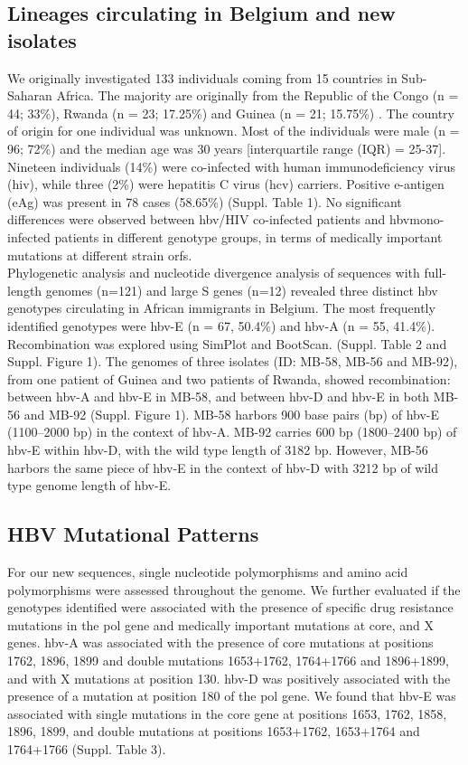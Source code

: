 \subsection{Lineages circulating in Belgium and new isolates}
We originally investigated 133 individuals coming from 15 countries in Sub-Saharan Africa. The majority are originally from the Republic of the Congo (n = 44; 33\%), Rwanda (n = 23; 17.25\%) and Guinea (n = 21; 15.75\%) . The country of origin for one individual was unknown. Most of the individuals were male (n = 96; 72\%) and the median age was 30 years [interquartile range (IQR) = 25-37]. Nineteen individuals (14\%) were co-infected with human immunodeficiency virus (\gls{hiv}), while three (2\%) were hepatitis C virus (\gls{hcv}) carriers. Positive e-antigen (eAg) was present in 78 cases (58.65\%) (Suppl. Table 1). No significant differences were observed between \gls{hbv}/HIV co-infected patients and \gls{hbv}mono-infected patients in different genotype groups, in terms of medically important mutations at different strain \gls{orf}s.\\

Phylogenetic analysis and nucleotide divergence analysis of sequences with full-length genomes (n=121) and large S genes (n=12) revealed three distinct \gls{hbv} genotypes circulating in African immigrants in Belgium. The most frequently identified genotypes were \gls{hbv}-E (n = 67, 50.4\%) and \gls{hbv}-A (n = 55, 41.4\%).  Recombination was explored using SimPlot and BootScan. (Suppl. Table 2 and  Suppl. Figure 1). The genomes of three isolates (ID: MB-58, MB-56 and MB-92), from one patient of Guinea and two patients of Rwanda, showed recombination: between \gls{hbv}-A and \gls{hbv}-E in MB-58, and between \gls{hbv}-D and \gls{hbv}-E in both MB-56 and MB-92 (Suppl. Figure 1). MB-58 harbors 900 base pairs (bp) of \gls{hbv}-E (1100--2000 bp) in the context of \gls{hbv}-A. MB-92 carries 600 bp (1800--2400 bp) of \gls{hbv}-E within \gls{hbv}-D, with the wild type length of 3182 bp. However, MB-56 harbors the same piece of \gls{hbv}-E in the context of \gls{hbv}-D with 3212 bp of wild type genome length of \gls{hbv}-E. 

\subsection{HBV Mutational Patterns}
For our new sequences, single nucleotide polymorphisms and amino acid polymorphisms were assessed throughout the genome. We further evaluated if the genotypes identified were associated with the presence of specific drug resistance mutations in the pol gene and medically important mutations at core, and X genes. \gls{hbv}-A was associated with the presence of core mutations at positions 1762, 1896, 1899 and double mutations 1653+1762, 1764+1766 and 1896+1899, and with X mutations at position 130. \gls{hbv}-D was positively associated with the presence of a mutation at position 180 of the pol gene. We found that \gls{hbv}-E was associated with single mutations in the core gene at positions 1653, 1762, 1858, 1896, 1899, and double mutations at positions 1653+1762, 1653+1764 and 1764+1766 (Suppl. Table 3).\\

